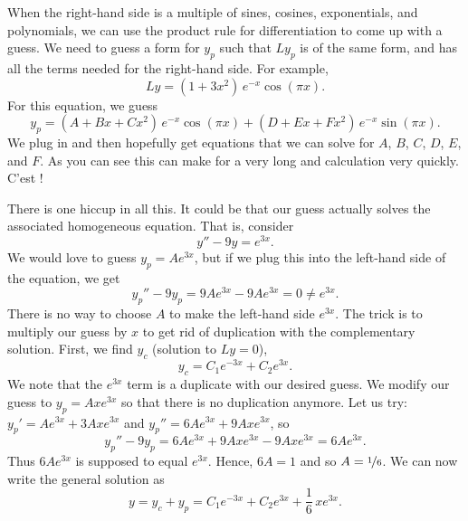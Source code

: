 \medskip

When the right-hand side is a multiple of sines, cosines, exponentials,
and polynomials, we can use the product rule
for differentiation to come up with a guess.  We
need to guess a
form for $y_p$ such that $Ly_p$ is of the same form, and 
has all the terms needed for 
the right-hand side.
For example,
\begin{equation*}
Ly = (1+3x^2)\,e^{-x}\cos (\pi x) .
\end{equation*}
For this equation, we guess
\begin{equation*}
y_p = (A + Bx + Cx^2)\,e^{-x} \cos (\pi x) + 
(D + Ex + Fx^2)\,e^{-x} \sin (\pi x) .
\end{equation*}
We plug in and then hopefully get equations that we can solve for
$A$, $B$, $C$, $D$, $E$, and $F$.
As you can see this can make for a very long and
calculation very quickly.  C'est ! %

\medskip

There is one hiccup in all this.  It could be that our guess actually
solves the associated homogeneous equation.  That is, consider
\begin{equation*}
y'' - 9y = e^{3x} .
\end{equation*}
We would love to guess $y_p = Ae^{3x}$, but if we plug this into the
left-hand side of the equation, we get
\begin{equation*}
y_p''-9y_p = 9Ae^{3x} - 9Ae^{3x} = 0 \neq e^{3x} .
\end{equation*}
There is no way to choose $A$ to make the left-hand side $e^{3x}$.
The trick
is to multiply our guess by $x$ to get rid of duplication with the
complementary solution.  First, we find $y_c$ (solution to $Ly =
0$),
\begin{equation*}
y_c = C_1 e^{-3x} + C_2 e^{3x} .
\end{equation*}
We note that the $e^{3x}$ term is a duplicate with our desired guess.
We modify our guess to $y_p = Axe^{3x}$ so that there is no
duplication anymore.  Let us try:
$y_p' = Ae^{3x} + 3Axe^{3x}$ and 
$y_p'' = 6Ae^{3x} + 9Axe^{3x}$, so
\begin{equation*}
y_p'' -9y_p = 6Ae^{3x} + 9Axe^{3x} - 9Axe^{3x} = 
6Ae^{3x} .
\end{equation*}
Thus $6Ae^{3x}$ is supposed to equal $e^{3x}$.  Hence,
$6A = 1$ and so $A=\nicefrac{1}{6}$.  We can now write the general
solution as
\begin{equation*}
y = y_c + y_p = 
C_1 e^{-3x} + C_2 e^{3x} + \frac{1}{6}\,xe^{3x} .
\end{equation*}

